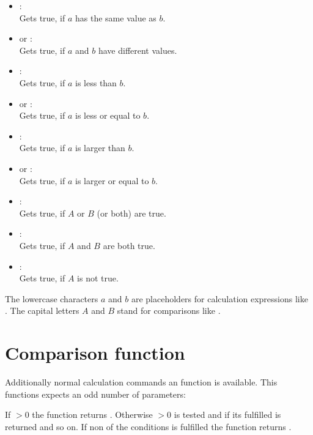 \begin{itemize}

\item
{}:\\
Gets true, if $a$ has the same value as $b$.

\item
{} or :\\
Gets true, if $a$ and $b$ have different values.

\item
{}:\\
Gets true, if $a$ is less than $b$.

\item
{} or :\\
Gets true, if $a$ is less or equal to $b$.

\item
{}:\\
Gets true, if $a$ is larger than $b$.

\item
{} or :\\
Gets true, if $a$ is larger or equal to $b$.

\item
{}:\\
Gets true, if $A$ or $B$ (or both) are true.

\item
{}:\\
Gets true, if $A$ and $B$ are both true.

\item
{}:\\
Gets true, if $A$ is not true.

\end{itemize}

The lowercase characters $a$ and $b$ are placeholders for calculation expressions like .
The capital letters $A$ and $B$ stand for comparisons like .



\section{Comparison function}

Additionally normal calculation commands an  function is available. This functions expects an odd number
of parameters:


If $>0$ the function returns .
Otherwise $>0$ is tested and if its fulfilled  is returned and so on.
If non of the conditions is fulfilled the function returns .